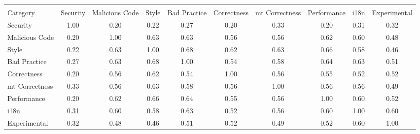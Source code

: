 
\begin{tabular}{lccccccccc}
\hline \\
Category & Security & Malicious Code & Style & Bad Practice & Correctness & {\sc mt} Correctness & Performance & i18n & Experimental \\ \hline 
Security & 1.00 & 0.20 & 0.22 & 0.27 & 0.20 & 0.33 & 0.20 & 0.31 & 0.32\\
Malicious Code & 0.20 & 1.00 & 0.63 & 0.63 & 0.56 & 0.56 & 0.62 & 0.60 & 0.48\\
Style & 0.22 & 0.63 & 1.00 & 0.68 & 0.62 & 0.63 & 0.66 & 0.58 & 0.46\\
Bad Practice & 0.27 & 0.63 & 0.68 & 1.00 & 0.54 & 0.58 & 0.64 & 0.63 & 0.51\\
Correctness & 0.20 & 0.56 & 0.62 & 0.54 & 1.00 & 0.56 & 0.55 & 0.52 & 0.52\\
{\sc mt} Correctness & 0.33 & 0.56 & 0.63 & 0.58 & 0.56 & 1.00 & 0.56 & 0.56 & 0.49\\
Performance & 0.20 & 0.62 & 0.66 & 0.64 & 0.55 & 0.56 & 1.00 & 0.60 & 0.52\\
i18n & 0.31 & 0.60 & 0.58 & 0.63 & 0.52 & 0.56 & 0.60 & 1.00 & 0.60\\
Experimental & 0.32 & 0.48 & 0.46 & 0.51 & 0.52 & 0.49 & 0.52 & 0.60 & 1.00\\
\hline
\end{tabular}
